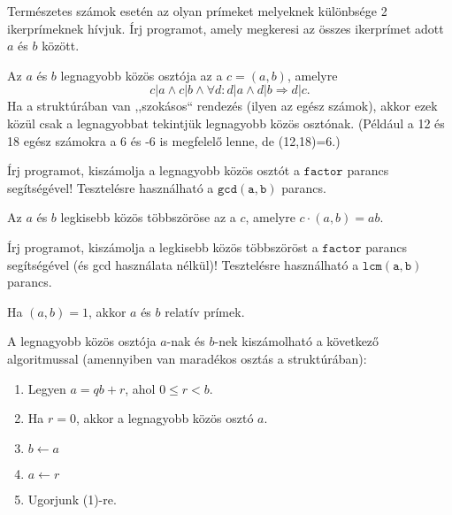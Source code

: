 \begin{exercise}[Ikerprímek]
    Természetes számok esetén az olyan prímeket melyeknek különbsége 2
    ikerprímeknek hívjuk. Írj programot, amely megkeresi az összes ikerprímet
    adott $a$ és $b$ között.
\end{exercise}

\begin{definition}
  Az $a$ és $b$ legnagyobb közös osztója az a $c = (a,b)$, amelyre
  \[ c|a \wedge c|b \wedge \forall d: d|a \wedge d|b \Rightarrow d|c. \]
  Ha a struktúrában van ,,szokásos`` rendezés (ilyen az egész számok), akkor ezek
  közül csak a legnagyobbat tekintjük legnagyobb közös osztónak. (Például a 12
  és 18 egész számokra a 6 és -6 is megfelelő lenne, de (12,18)=6.)
\end{definition}

\begin{exercise}
  Írj programot, kiszámolja a legnagyobb közös osztót a $\mathtt{factor}$
  parancs segítségével! Tesztelésre használható a $\mathtt{gcd(a,b)}$ parancs.
\end{exercise}

\begin{definition}
  Az $a$ és $b$ legkisebb közös többszöröse az a $c$, amelyre $c\cdot(a,b)=ab$.
\end{definition}

\begin{exercise}
  Írj programot, kiszámolja a legkisebb közös többszöröst a $\mathtt{factor}$
  parancs segítségével (és gcd használata nélkül)! Tesztelésre használható a
  $\mathtt{lcm(a,b)}$ parancs.
\end{exercise}

\begin{definition}
  Ha $(a,b)=1$, akkor $a$ és $b$ relatív prímek.
\end{definition}

\begin{definition} A legnagyobb közös
  osztója $a$-nak és $b$-nek kiszámolható a következ\H o algoritmussal
  (amennyiben van maradékos osztás a struktúrában):
  \begin{enumerate}
    \item Legyen $a = qb + r$, ahol $0 \le r < b$.
    \item Ha $r = 0$, akkor a legnagyobb közös osztó $a$.
    \item $b \leftarrow a$
    \item $a \leftarrow  r$
    \item Ugorjunk (1)-re.
  \end{enumerate}
\end{definition}

